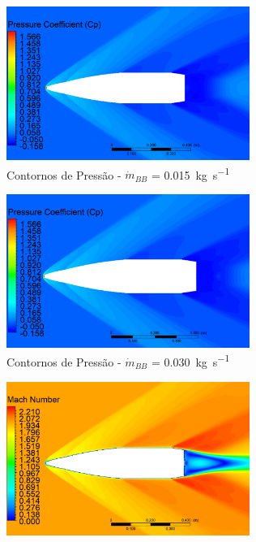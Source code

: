 \begin{figure}[!ht]
	\centering
	\begin{subfigure}[b]{0.47\textwidth}
        \centering
        \includegraphics[height=5cm,width=\textwidth]{contorno-pressao-2306K-vazao-0015-1pol.png}
        \caption{Contornos de Pressão - \(\Dot{m}_{BB}\) = \qty{0,015}{\kilogram\per\second}}
        \label{fig:contorno-pressao-bb-1pol-vazao0015}
    \end{subfigure}
    \hfill
    \begin{subfigure}[b]{0.47\textwidth}
        \centering
        \includegraphics[height=5cm,width=\textwidth]{contorno-pressao-2306K-vazao-0030-1pol.png}
        \caption{Contornos de Pressão - \(\Dot{m}_{BB}\) = \qty{0,030}{\kilogram\per\second}}
        \label{fig:contorno-pressao-bb-1pol-vazao0030}
    \end{subfigure}
    \hfill
    \begin{subfigure}[b]{0.47\textwidth}
        \centering
        \includegraphics[height=5cm,width=\textwidth]{contorno-velocidade-2306K-vazao-0015-1pol.png}

\end{subfigure}
\end{figure}

